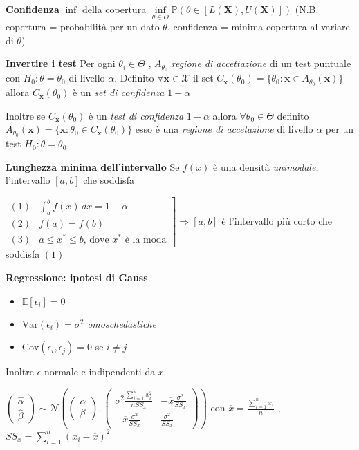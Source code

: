 \documentclass[openany]{book} %
\begin{document}
\textbf{Confidenza} $\inf$ della copertura $\underset{\theta\in\Theta}{\inf}\mathbb{P}(\theta\in[L(\boldsymbol{X}),U(\boldsymbol{X})])$ (N.B. copertura = probabilità per un dato $\theta$, confidenza = minima copertura al variare di $\theta$)

\textbf{Invertire i test} Per ogni $\theta_i\in\Theta$ , $A_{\theta_0}$ \textit{regione di accettazione} di un test puntuale con $H_0:\theta=\theta_0$ di livello $\alpha$. Definito $\forall \boldsymbol{x}\in \mathcal{X}$ il set $C_{\boldsymbol{x}}(\theta_0)=\{\theta_0:\boldsymbol{x}\in A_{\theta_0}(\boldsymbol{x})\}$ allora $C_{\boldsymbol{x}}(\theta_0)$ è un \textit{set di confidenza} $1-\alpha$

Inoltre se $C_{\boldsymbol{x}}(\theta_0)$ è un \textit{test di confidenza} $1-\alpha$ allora $\forall\theta_0\in\Theta$ definito $A_{\theta_0}(\boldsymbol{x})=\{\boldsymbol{x}:\theta_0\in C_{\boldsymbol{x}}(\theta_0)\}$ esso è una \textit{regione di accetazione} di livello $\alpha$ per un test $H_0:\theta=\theta_0$

\textbf{Lunghezza minima dell'intervallo} Se $f(x)$ è una densità \textit{unimodale}, l'intervallo $[a,b]$ che soddisfa

$\left. \begin{array}{ll}
		(1) & \int_a^bf(x)\,dx=1-\alpha                           \\
		(2) & f(a)=f(b)                                           \\
		(3) & a\leq x^*\leq b \text{, dove }x^* \text{ è la moda}
	\end{array}\right]
	\Rightarrow [a,b]$ è l'intervallo più corto che soddisfa $(1)$

\textbf{Regressione: ipotesi di Gauss}

\begin{itemize}

	\item $\mathbb{E}[\epsilon_i]=0$

	\item $\text{Var}(\epsilon_i)=\sigma^2$ \textit{omoschedastiche}

	\item $\text{Cov}(\epsilon_i,\epsilon_j)=0$ se $i\neq j$

\end{itemize}

Inoltre $\epsilon$ normale e indipendenti da $x$

$\left(\begin{array}{c}\hat\alpha \\ \hat\beta\end{array}\right)\sim \mathcal{N}\left(\left(\begin{array}{c} \alpha \\ \beta \end{array}\right),\left(\begin{array}{cc} \sigma^2 \frac{\sum_{i=1}^nx_i^2}{nSS_x} & -\overline x \frac{\sigma^2}{SS_x} \\ -\overline x \frac{\sigma^2}{SS_x} & \frac{\sigma^2}{SS_x} \end{array}\right)\right)$ con $\overline x = \frac{\sum_{i=1}^nx_i}{n}$ , $SS_x = \sum_{i=1}^n(x_i-\overline x)^2 $
\end{document}
